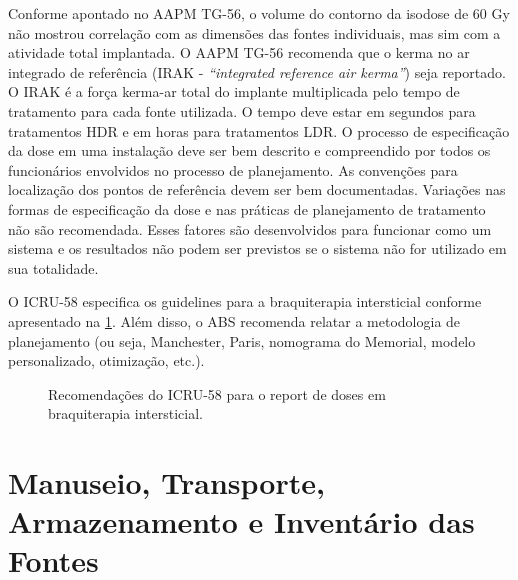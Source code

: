 \documentclass[11pt,a4paper]{article}
\begin{document}
	Conforme apontado no AAPM TG-56, o volume do contorno da isodose de 60 Gy não mostrou correlação com as dimensões das fontes individuais, mas sim com a atividade total implantada. O AAPM TG-56 recomenda que o kerma no ar integrado de referência (IRAK - \textit{``integrated reference air kerma''}) seja reportado. O IRAK é a força kerma-ar total do implante multiplicada pelo tempo de tratamento para cada fonte utilizada. O tempo deve estar em segundos para tratamentos HDR e em horas para tratamentos LDR. O processo de especificação da dose em uma instalação deve ser bem descrito e compreendido por todos os funcionários envolvidos no processo de planejamento. As convenções para localização dos pontos de referência devem ser bem documentadas. Variações nas formas de especificação da dose e nas práticas de planejamento de tratamento não são recomendada. Esses fatores são desenvolvidos para funcionar como um sistema e os resultados não podem ser previstos se o sistema não for utilizado em sua totalidade.

	O ICRU-58 especifica os guidelines para a braquiterapia intersticial conforme apresentado na \ref{fig:recomendacaoIcruReportIntersticial}. Além disso, o ABS recomenda relatar a metodologia de planejamento (ou seja, Manchester, Paris, nomograma do Memorial, modelo personalizado, otimização, etc.).

	\begin{figure}[h]
		\centering
		\caption{Recomendações do ICRU-58 para o report de doses em braquiterapia intersticial.}
		\label{fig:recomendacaoIcruReportIntersticial}
	\end{figure}


\section{Manuseio, Transporte, Armazenamento e Inventário das Fontes}
\end{document}
